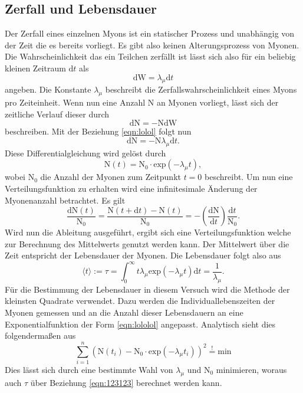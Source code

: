 \subsection{Zerfall und Lebensdauer}
Der Zerfall eines einzelnen Myons ist ein statischer Prozess und unabhängig von der Zeit die es bereits vorliegt. Es gibt also keinen Alterungsprozess von Myonen.
Die Wahrscheinlichkeit das ein Teilchen zerfällt ist lässt sich also für ein beliebig kleinen Zeitraum $\text{d}t$ als
\begin{equation}
    \label{eqn:lolol}
\text{dW} = \lambda_{\mu} \text{d}t
\end{equation}
angeben. Die Konstante $\lambda_{\mu}$ beschreibt die Zerfallswahrscheinlichkeit eines Myons pro Zeiteinheit.
Wenn nun eine Anzahl N an Myonen vorliegt, lässt sich der zeitliche Verlauf dieser durch
\begin{equation}
\text{dN} = - \text{N} \text{dW}
\end{equation}
beschreiben. Mit der Beziehung \ref{eqn:lolol} folgt nun
\begin{equation*}
\text{dN} = - \text{N} \lambda_{\mu} \text{d}t.
\end{equation*}
Diese Differentialgleichung wird gelöst durch 
\begin{equation}
    \label{eqn:lololol}
\text{N}(t) = \text{N}_0 \cdot \text{exp}(- \lambda_{\mu}t),
\end{equation}
wobei $\text{N}_0$ die Anzahl der Myonen zum Zeitpunkt $t=0$ beschreibt. Um nun eine Verteilungsfunktion zu erhalten wird eine infinitesimale
Änderung der Myonenanzahl betrachtet. Es gilt
\begin{equation}
\frac{\text{dN}(t)}{\text{N}_0} = \frac{\text{N}(t + \text{d}t) - \text{N}(t)}{\text{N}_0} = - \left(\frac{\text{dN}}{\text{d}t}\right)\frac{\text{d}t}{\text{N}_0}.
\end{equation}
Wird nun die Ableitung ausgeführt, ergibt sich eine Verteilungsfunktion welche zur Berechnung des Mittelwerts genutzt werden kann. Der Mittelwert über die Zeit 
entspricht der Lebensdauer der Myonen. Die Lebensdauer folgt also aus
\begin{equation}
    \label{eqn:123123}
    \langle t \rangle := \tau = \int_0^{\infty} t \lambda_{\mu} \text{exp}(- \lambda_{\mu} t) \text{d}t = \frac{1}{\lambda_{\mu}}.
\end{equation}
Für die Bestimmung der Lebensdauer in diesem Versuch wird die Methode der kleinsten Quadrate verwendet. Dazu werden die Individuallebenszeiten der Myonen gemessen und an 
die Anzahl dieser Lebensdauern an eine Exponentialfunktion der Form \ref{eqn:lololol} angepasst. 
Analytisch sieht dies folgendermaßen aus
\begin{equation}
\sum_{i=1}^{n} \left( \text{N}(t_i) - \text{N}_0 \cdot \text{exp}(- \lambda_{\mu}t_i)\right)^2 \stackrel{!}{=} \text{min}
\end{equation}
Dies lässt sich durch eine bestimmte Wahl von $\lambda_{\mu}$ und $\text{N}_0$ minimieren, woraus auch $\tau$ über Beziehung \ref{eqn:123123} berechnet werden kann.